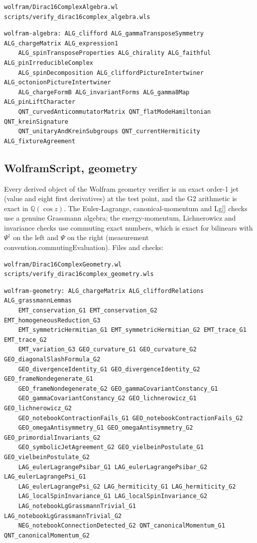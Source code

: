 \documentclass[11pt]{article}
\begin{document}
\begin{Verbatim}[fontsize=\small]
wolfram/Dirac16ComplexAlgebra.wl
scripts/verify_dirac16complex_algebra.wls
\end{Verbatim}

\begin{Verbatim}[fontsize=\small]
wolfram-algebra: ALG_clifford ALG_gammaTransposeSymmetry ALG_chargeMatrix ALG_expression1
    ALG_spinTransposeProperties ALG_chirality ALG_faithful ALG_pinIrreducibleComplex
    ALG_spinDecomposition ALG_cliffordPictureIntertwiner ALG_octonionPictureIntertwiner
    ALG_chargeFormB ALG_invariantForms ALG_gamma8Map ALG_pinLiftCharacter
    QNT_curvedAnticommutatorMatrix QNT_flatModeHamiltonian QNT_kreinSignature
    QNT_unitaryAndKreinSubgroups QNT_currentHermiticity ALG_fixtureAgreement
\end{Verbatim}

\subsection{WolframScript, geometry}

Every derived object of the Wolfram geometry verifier is an exact order-1 jet (value and eight first derivatives) at the test point, and the G2 arithmetic is exact in $\mathbb Q(\cos z)$. The Euler-Lagrange, canonical-momentum and Lg[] checks use a genuine Grassmann algebra; the energy-momentum, Lichnerowicz and invariance checks use commuting exact numbers, which is exact for bilinears with $\Psi^\dagger$ on the left and $\Psi$ on the right (measurement convention.commutingEvaluation). Files and checks:

\begin{Verbatim}[fontsize=\small]
wolfram/Dirac16ComplexGeometry.wl
scripts/verify_dirac16complex_geometry.wls
\end{Verbatim}

\begin{Verbatim}[fontsize=\small]
wolfram-geometry: ALG_chargeMatrix ALG_cliffordRelations ALG_grassmannLemmas
    EMT_conservation_G1 EMT_conservation_G2 EMT_homogeneousReduction_G3
    EMT_symmetricHermitian_G1 EMT_symmetricHermitian_G2 EMT_trace_G1 EMT_trace_G2
    EMT_variation_G3 GEO_curvature_G1 GEO_curvature_G2 GEO_diagonalSlashFormula_G2
    GEO_divergenceIdentity_G1 GEO_divergenceIdentity_G2 GEO_frameNondegenerate_G1
    GEO_frameNondegenerate_G2 GEO_gammaCovariantConstancy_G1
    GEO_gammaCovariantConstancy_G2 GEO_lichnerowicz_G1 GEO_lichnerowicz_G2
    GEO_notebookContractionFails_G1 GEO_notebookContractionFails_G2
    GEO_omegaAntisymmetry_G1 GEO_omegaAntisymmetry_G2 GEO_primordialInvariants_G2
    GEO_symbolicJetAgreement_G2 GEO_vielbeinPostulate_G1 GEO_vielbeinPostulate_G2
    LAG_eulerLagrangePsibar_G1 LAG_eulerLagrangePsibar_G2 LAG_eulerLagrangePsi_G1
    LAG_eulerLagrangePsi_G2 LAG_hermiticity_G1 LAG_hermiticity_G2
    LAG_localSpinInvariance_G1 LAG_localSpinInvariance_G2
    LAG_notebookLgGrassmannTrivial_G1 LAG_notebookLgGrassmannTrivial_G2
    NEG_notebookConnectionDetected_G2 QNT_canonicalMomentum_G1 QNT_canonicalMomentum_G2
\end{Verbatim}
\end{document}

